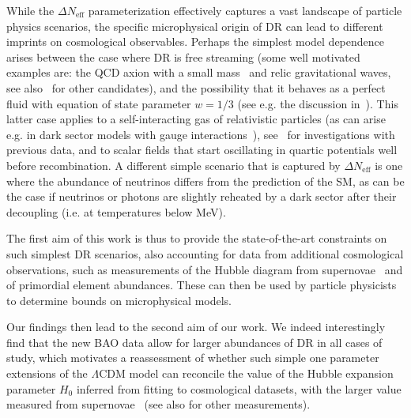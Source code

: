 \documentclass[aps,prd,twocolumn,notitlepage,
superscriptaddress,
nofootinbib,floatfix]{revtex4-2}
\begin{document}
While the $\Delta N_\text{eff}$ parameterization effectively captures a vast landscape of particle physics scenarios, the specific microphysical origin of DR can lead to different imprints on cosmological observables. Perhaps the simplest model dependence arises between the case where DR is free streaming (some well motivated examples are: the QCD axion with a small mass~\cite{Turner:1986tb, Kolb:1990vq, Berezhiani:1992rk, Chang:1993gm, Masso:2002np, Ferreira:2020bpb, Notari:2022ffe, DEramo:2018vss, Ferreira:2018vjj} and relic gravitational waves, see also~\cite{Baumann:2016wac} for other candidates), and the possibility that it behaves as a perfect fluid with equation of state parameter $w=1/3$ (see e.g. the discussion in~\cite{Baumann:2015rya}). This latter case applies to a self-interacting gas of relativistic particles (as can arise e.g. in dark sector models with gauge interactions~\cite{Chacko:2015noa, Buen-Abad:2015ova, Chacko:2016kgg, Nakagawa:2022knn}), see~\cite{Cyr-Racine:2015ihg,Lesgourgues:2015wza, Brust:2017nmv, Buen-Abad:2017gxg,Archidiacono:2019wdp, Blinov:2020hmc} for investigations with previous data, and to scalar fields that start oscillating in quartic potentials well before recombination. A different simple scenario that is captured by $\Delta N_\text{eff}$ is one where the abundance of neutrinos differs from the prediction of the SM, as can be the case if neutrinos or photons are slightly reheated by a dark sector after their decoupling (i.e. at temperatures below MeV). 

The first aim of this work is thus to provide the state-of-the-art constraints on such simplest DR scenarios, also accounting for data from additional cosmological observations, such as measurements of the Hubble diagram from supernovae~\cite{Scolnic:2021amr} and of primordial element abundances. These can then be used by particle physicists to determine bounds on microphysical models.

Our findings then lead to the second aim of our work. We indeed interestingly find that the new BAO data allow for larger abundances of DR in all cases of study, which motivates a reassessment of whether such simple one parameter extensions of the $\Lambda$CDM model can reconcile the value of the Hubble expansion parameter $H_0$ inferred from fitting to cosmological datasets, with the larger value measured from supernovae~\cite{Riess:2021jrx} (see also \cite{Wong:2019kwg,Scolnic:2023mrv, Freedman:2021ahq} for other measurements).
\end{document}
